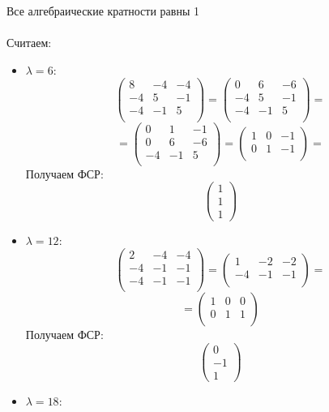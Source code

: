 \documentclass[a4paper,12pt]{article}
\begin{document}
Все алгебраические кратности равны 1
\\\\
Считаем:
\begin{itemize}
\item $\lambda = 6$:
\[
\begin{pmatrix}
8 & -4 & -4  \\
-4 & 5 & -1  \\
-4 & -1 & 5  \\
\end{pmatrix}
=
\begin{pmatrix}
0 & 6 & -6  \\
-4 & 5 & -1  \\
-4 & -1 & 5  \\
\end{pmatrix}
=
\]
\[
=
\begin{pmatrix}
0 & 1 & -1 \\
0 & 6 & -6 \\
-4 & -1 & 5  \\
\end{pmatrix}
=
\begin{pmatrix}
1 & 0 & -1 \\
0 & 1 & -1 \\
\end{pmatrix}
=
\]
Получаем ФСР:
\[
\begin{pmatrix}
1 \\ 1 \\ 1
\end{pmatrix}
\]
\item $\lambda = 12$:
\[
\begin{pmatrix}
2& -4& -4 \\
-4 & -1 & -1 \\
-4 & -1 & -1 \\
\end{pmatrix}
=
\begin{pmatrix}
1& -2& -2 \\
-4 & -1 & -1 \\
\end{pmatrix}
=
\]
\[
=
\begin{pmatrix}
1& 0& 0 \\
0 & 1 & 1 \\
\end{pmatrix}
\]
Получаем ФСР:
\[
\begin{pmatrix}
0 \\ -1 \\ 1
\end{pmatrix}
\]
\item $\lambda = 18$:

\end{itemize}
\end{document}
